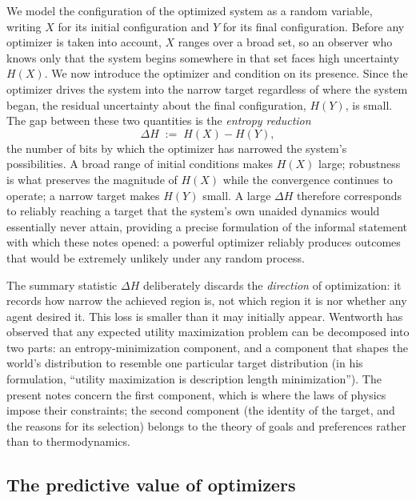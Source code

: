 \documentclass[11pt]{article}
\begin{document}
We model the configuration of the optimized system as a random variable, writing $X$ for its initial configuration and $Y$ for its final configuration. Before any optimizer is taken into account, $X$ ranges over a broad set, so an observer who knows only that the system begins somewhere in that set faces high uncertainty $H(X)$. We now introduce the optimizer and condition on its presence. Since the optimizer drives the system into the narrow target regardless of where the system began, the residual uncertainty about the final configuration, $H(Y)$, is small. The gap between these two quantities is the \emph{entropy reduction}
\[
\Delta H \;:=\; H(X) - H(Y),
\]
the number of bits by which the optimizer has narrowed the system's possibilities. A broad range of initial conditions makes $H(X)$ large; robustness is what preserves the magnitude of $H(X)$ while the convergence continues to operate; a narrow target makes $H(Y)$ small. A large $\Delta H$ therefore corresponds to reliably reaching a target that the system's own unaided dynamics would essentially never attain, providing a precise formulation of the informal statement with which these notes opened: a powerful optimizer reliably produces outcomes that would be extremely unlikely under any random process.

\begin{remark}
\label{rem:translation}
The summary statistic $\Delta H$ deliberately discards the \emph{direction} of optimization: it records how narrow the achieved region is, not which region it is nor whether any agent desired it. This loss is smaller than it may initially appear. Wentworth has observed that any expected utility maximization problem can be decomposed into two parts: an entropy-minimization component, and a component that shapes the world's distribution to resemble one particular target distribution (in his formulation, ``utility maximization is description length minimization''). The present notes concern the first component, which is where the laws of physics impose their constraints; the second component (the identity of the target, and the reasons for its selection) belongs to the theory of goals and preferences rather than to thermodynamics.
\end{remark}

\subsection{The predictive value of optimizers}
\label{sec:prediction}
\end{document}
